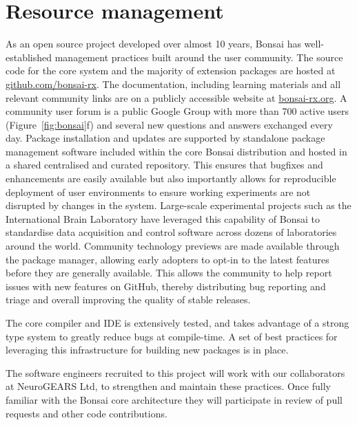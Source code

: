 \section{Resource management}
%
As an open source project developed over almost 10 years, Bonsai 
has well-established management practices built around the user community.
%
The source code for the core system and the majority of extension packages
are hosted at \url{github.com/bonsai-rx}.
%
The documentation, including learning materials and all relevant community
links are on a publicly accessible website at \url{bonsai-rx.org}.
%
A community user forum is a public Google Group with more than 700 active users (Figure~\ref{fig:bonsai}f) and several
new questions and answers exchanged every day.
%
Package installation and updates are supported by standalone package
management software included within the core Bonsai distribution and hosted
in a shared centralised and curated repository.
%
This ensures that bugfixes and enhancements are easily available but
also importantly allows for reproducible deployment of user environments
to ensure working experiments are not disrupted by changes in the system.
Large-scale experimental projects such as the International Brain Laboratory
have leveraged this capability of Bonsai to standardise data acquisition and
control software across dozens of laboratories around the world.
%
Community technology previews are made available through the package manager,
allowing early adopters to opt-in to the latest features
before they are generally available. This allows the community
to help report issues with new features on GitHub, thereby
distributing bug reporting and triage and overall improving the quality of
stable releases.

The core compiler and IDE is extensively tested, and takes advantage of
a strong type system to greatly reduce bugs at compile-time. A set of best
practices for leveraging this infrastructure for building new packages is
in place.

The software engineers recruited to this project will work with our
collaborators at NeuroGEARS Ltd, to strengthen and maintain these
practices.  Once fully familiar with the Bonsai core architecture they
will participate in review of pull requests and other code contributions.


